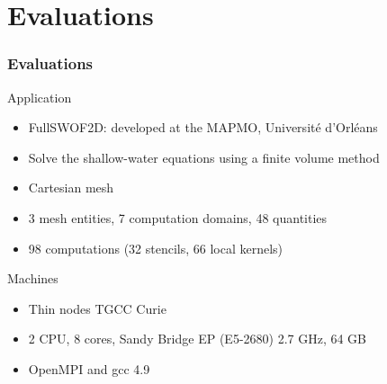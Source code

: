 \documentclass{beamer}
\begin{document}
\section{Evaluations}
\begin{frame}
\frametitle{Evaluations}
\begin{block}{Application}
\begin{itemize}
\item FullSWOF2D: developed at the MAPMO, Université d'Orléans
\item Solve the shallow-water equations using a finite volume method
\item Cartesian mesh
\item 3 mesh entities, 7 computation domains, 48 quantities
\item 98 computations (32 stencils, 66 local kernels)
\end{itemize}
\end{block}
\begin{block}{Machines}
\begin{itemize}
\item Thin nodes TGCC Curie
\item 2 CPU, 8 cores, Sandy Bridge EP (E5-2680) 2.7 GHz, 64 GB
\item OpenMPI and gcc 4.9
\end{itemize}
\end{block}
\end{frame}
\end{document}
